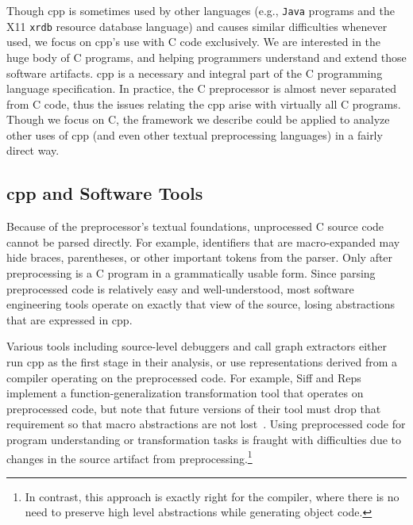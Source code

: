 \documentclass{article}
\newcommand{\Cpp}{\mbox{\textsf{cpp}}}
\newcommand{\C}{\mbox{C}}
\newcommand{\eg}{e.g.,}
\begin{document}
Though \Cpp{} is sometimes used by other languages (\eg{}
\texttt{Java} programs and the X11 \texttt{xrdb} resource database
language) and causes similar difficulties whenever used, we focus on
\Cpp{}'s use with \C{} code exclusively.  We are interested in the huge
body of \C{} programs, and helping programmers understand and extend
those software artifacts. \Cpp{} is a necessary and integral part of the
\C{} programming language specification.  In practice, the \C{}
preprocessor is almost never separated from \C{} code, thus the issues
relating the \Cpp{} arise with virtually all \C{} programs.  Though we
focus on \C{}, the framework we describe could be applied to analyze other
uses of \Cpp{} (and even other textual preprocessing languages) in a
fairly direct way.



\subsection*{\Cpp{} and Software Tools}

Because of the preprocessor's textual foundations, unprocessed \C{} source code
cannot be parsed directly.  For example, identifiers that are macro-expanded may
hide braces, parentheses, or other 
important tokens from the parser.  Only after preprocessing is a \C{} program
in a grammatically usable form. Since parsing
preprocessed code is relatively easy and well-understood,
most software engineering tools operate on
exactly that view of the source, losing abstractions that are
expressed in \Cpp{}.  

Various tools including source-level debuggers and call graph extractors
either run \Cpp{} as the first stage in their analysis, or use
representations derived from a compiler operating on the preprocessed
code.  For example,
Siff and Reps implement a function-generalization transformation
tool that operates on preprocessed code, but note that future versions
of their tool must drop that requirement so that macro abstractions are
not lost~\cite{Siff96}. Using preprocessed code for program
understanding or transformation tasks is fraught with difficulties due
to changes in the source artifact from preprocessing.\footnote{In
  contrast, this approach is exactly right for the compiler, where there is
  no need to preserve high level abstractions while generating object
  code.}
\end{document}
